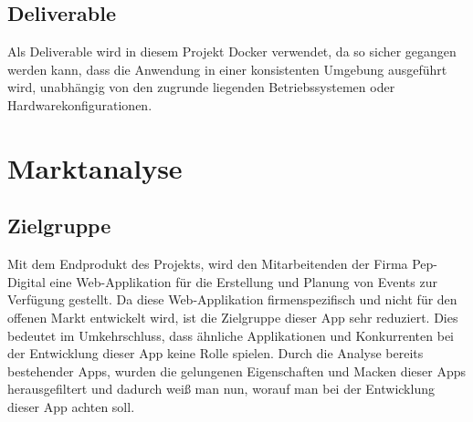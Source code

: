 \documentclass[a4paper,12pt]{article}
\begin{document}
\subsection{Deliverable}
Als Deliverable wird in diesem Projekt Docker verwendet, da so sicher gegangen werden kann, dass die Anwendung in einer konsistenten Umgebung ausgeführt wird, unabhängig von den zugrunde liegenden Betriebssystemen oder Hardwarekonfigurationen.
\newpage
\section{Marktanalyse}
\subsection{Zielgruppe}
Mit dem Endprodukt des Projekts, wird den Mitarbeitenden der Firma Pep-Digital eine Web-Applikation für die Erstellung und Planung von Events zur Verfügung gestellt. Da diese Web-Applikation firmenspezifisch und  nicht für den offenen Markt entwickelt wird, ist die Zielgruppe dieser App sehr reduziert. Dies bedeutet im Umkehrschluss, dass ähnliche Applikationen und Konkurrenten bei der Entwicklung dieser App keine Rolle spielen. Durch die Analyse bereits bestehender Apps, wurden die gelungenen Eigenschaften und Macken dieser Apps herausgefiltert und dadurch weiß man nun, worauf man bei der Entwicklung dieser App achten soll.
\end{document}
